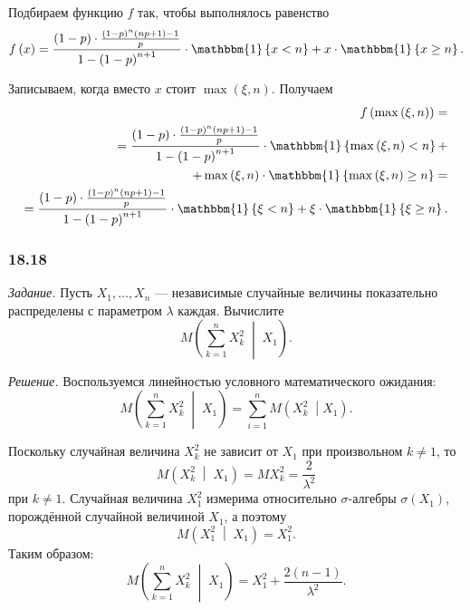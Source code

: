 \begin{enumerate}[label=\alph*)]
  Подбираем функцию $f$ так, чтобы выполнялось равенство
  $$f \left( x \right) =
    \frac{ \left( 1 - p \right) \cdot \frac{ \left( 1 - p \right)^n \left( np + 1 \right) - 1}{p}}{1 - \left( 1 - p \right)^{n + 1}} \cdot
    \mathbbm{1} \left\{ x < n \right\} +
    x \cdot \mathbbm{1} \left\{ x \geq n \right\}.$$

  Записываем, когда вместо $x$ стоит $ \max \left( \xi, n \right) $.
  Получаем
  \begin{equation*}
    \begin{split}
      f \left( \max \left( \xi, n \right) \right) = \\
      = \frac{ \left( 1 - p \right) \cdot \frac{ \left( 1 - p \right)^n \left( np + 1 \right) - 1}{p}}{1 - \left( 1 - p \right)^{n + 1}} \cdot
      \mathbbm{1} \left\{ \max \left( \xi, n \right) < n \right\} + \\
      + \max \left( \xi, n \right) \cdot
      \mathbbm{1} \left\{ \max \left( \xi, n \right) \geq n \right\} = \\
      = \frac{ \left( 1 - p \right) \cdot \frac{ \left( 1 - p \right)^n \left( np + 1 \right) - 1}{p}}{1 - \left( 1 - p \right)^{n + 1}} \cdot
      \mathbbm{1} \left\{ \xi < n \right\} +
      \xi \cdot \mathbbm{1} \left\{ \xi \geq n \right\}.
    \end{split}
  \end{equation*}
\end{enumerate}

\subsubsection*{18.18}

\textit{Задание.}
Пусть $X_1, \dotsc, X_n$ ---
независимые случайные величины показательно распределены с параметром $ \lambda $ каждая.
Вычислите
$$M \left( \sum \limits_{k = 1}^n X_k^2 \; \middle| \; X_1 \right).$$

\textit{Решение.} Воспользуемся линейностью условного математического ожидания:
$$M \left( \sum \limits_{k = 1}^n X_k^2 \; \middle| \; X_1 \right) =
  \sum \limits_{i = 1}^n M \left( X_k^2 \; \middle| X_1 \right).$$

Поскольку случайная величина $X_k^2$ не зависит от $X_1$ при произвольном $k \neq 1$, то
$$M \left( X_k^2 \; \middle| \; X_1 \right) =
  MX_k^2 =
  \frac{2}{ \lambda^2}$$
при $k \neq 1$.
Случайная величина $X_1^2$ измерима относительно $ \sigma $-алгебры $ \sigma \left( X_1 \right) $,
порождённой случайной величиной $X_1$,
а поэтому
$$M \left( X_1^2 \; \middle| \; X_1 \right) =
  X_1^2.$$
Таким образом:
$$M \left( \sum \limits_{k = 1}^n X_k^2 \; \middle| \; X_1 \right) =
  X_1^2 + \frac{2 \left( n - 1 \right) }{ \lambda^2}.$$

